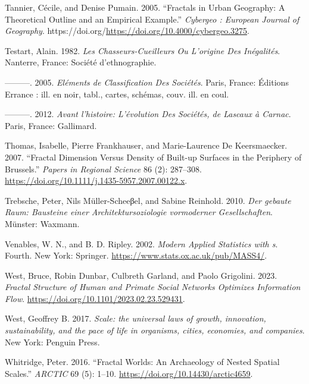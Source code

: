 \documentclass[
  12pt,
  a4paper, twoside]{book}
\newlength{\cslhangindent}
\newlength{\cslentryspacingunit} %
\newenvironment{CSLReferences}[2] %
 {%
  \setlength{\parindent}{0pt}
  \ifodd #1
  \let\oldpar\par
  \def\par{\hangindent=\cslhangindent\oldpar}
  \fi
  \setlength{\parskip}{#2\cslentryspacingunit}
 }%
 {}
\begin{document}
\begin{CSLReferences}{1}{0}
\leavevmode{}%
Tannier, Cécile, and Denise Pumain. 2005. {``Fractals in Urban Geography: A Theoretical Outline and an Empirical Example.''} \emph{Cybergeo : European Journal of Geography}. https://doi.org/\url{https://doi.org/10.4000/cybergeo.3275}.

\leavevmode{}%
Testart, Alain. 1982. \emph{Les Chasseurs-Cueilleurs Ou L'origine Des Inégalités}. Nanterre, France: Société d'ethnographie.

\leavevmode{}%
---------. 2005. \emph{Eléments de Classification Des Sociétés}. Paris, France: Éditions Errance : ill. en noir, tabl., cartes, schémas, couv. ill. en coul.

\leavevmode{}%
---------. 2012. \emph{Avant l'histoire: L'évolution Des Sociétés, de Lascaux à Carnac}. Paris, France: Gallimard.

\leavevmode{}%
Thomas, Isabelle, Pierre Frankhauser, and Marie-Laurence De Keersmaecker. 2007. {``Fractal Dimension Versus Density of Built-up Surfaces in the Periphery of Brussels.''} \emph{Papers in Regional Science} 86 (2): 287--308. \url{https://doi.org/10.1111/j.1435-5957.2007.00122.x}.

\leavevmode{}%
Trebsche, Peter, Nils Müller-Scheeβel, and Sabine Reinhold. 2010. \emph{Der gebaute Raum: Bausteine einer Architektursoziologie vormoderner Gesellschaften}. Münster: Waxmann.

\leavevmode{}%
Venables, W. N., and B. D. Ripley. 2002. \emph{Modern Applied Statistics with s}. Fourth. New York: Springer. \url{https://www.stats.ox.ac.uk/pub/MASS4/}.

\leavevmode{}%
West, Bruce, Robin Dunbar, Culbreth Garland, and Paolo Grigolini. 2023. \emph{Fractal Structure of Human and Primate Social Networks Optimizes Information Flow}. \url{https://doi.org/10.1101/2023.02.23.529431}.

\leavevmode{}%
West, Geoffrey B. 2017. \emph{Scale: the universal laws of growth, innovation, sustainability, and the pace of life in organisms, cities, economies, and companies}. New York: Penguin Press.

\leavevmode{}%
Whitridge, Peter. 2016. {``Fractal Worlds: An Archaeology of Nested Spatial Scales.''} \emph{ARCTIC} 69 (5): 1--10. \url{https://doi.org/10.14430/arctic4659}.


\end{CSLReferences}
\end{document}
